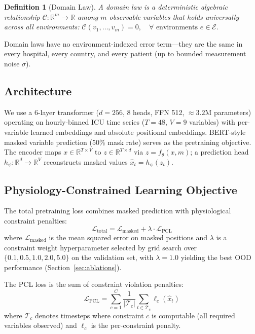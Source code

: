 \documentclass{article}
\newtheorem{definition}{Definition}
\begin{document}
\begin{definition}[Domain Law]
A domain law is a deterministic algebraic relationship $\mathcal{C}: \mathbb{R}^m \to \mathbb{R}$ among $m$ observable variables that holds universally across all environments:
$\mathcal{C}(v_1, \ldots, v_m) = 0, \quad \forall \text{ environments } e \in \mathcal{E}.$
\end{definition}

Domain laws have no environment-indexed error term---they are the same in every hospital, every country, and every patient (up to bounded measurement noise $\sigma$).

\subsection{Architecture}

We use a 6-layer transformer ($d{=}256$, 8 heads, FFN 512, ${\approx}3.2$M parameters) operating on hourly-binned ICU time series ($T{=}48$, $V{=}9$ variables) with per-variable learned embeddings and absolute positional embeddings.
BERT-style masked variable prediction (50\% mask rate) serves as the pretraining objective.
The encoder maps $x \in \mathbb{R}^{T \times V}$ to $z \in \mathbb{R}^{T \times d}$ via $z = f_\theta(x, m)$; a prediction head $h_\psi: \mathbb{R}^d \to \mathbb{R}^V$ reconstructs masked values $\hat{x}_t = h_\psi(z_t)$.

\subsection{Physiology-Constrained Learning Objective}

The total pretraining loss combines masked prediction with physiological constraint penalties:
\begin{equation}
\label{eq:total_loss}
\mathcal{L}_{\text{total}} = \mathcal{L}_{\text{masked}} + \lambda \cdot \mathcal{L}_{\text{PCL}}
\end{equation}
where $\mathcal{L}_{\text{masked}}$ is the mean squared error on masked positions and $\lambda$ is a constraint weight hyperparameter selected by grid search over $\{0.1, 0.5, 1.0, 2.0, 5.0\}$ on the validation set, with $\lambda = 1.0$ yielding the best OOD performance (Section~\ref{sec:ablations}).

The PCL loss is the sum of constraint violation penalties:
\begin{equation}
\mathcal{L}_{\text{PCL}} = \sum_{c=1}^{C} \frac{1}{|\mathcal{T}_c|} \sum_{t \in \mathcal{T}_c} \ell_c(\hat{x}_t)
\end{equation}
where $\mathcal{T}_c$ denotes timesteps where constraint $c$ is computable (all required variables observed) and $\ell_c$ is the per-constraint penalty.
\end{document}
